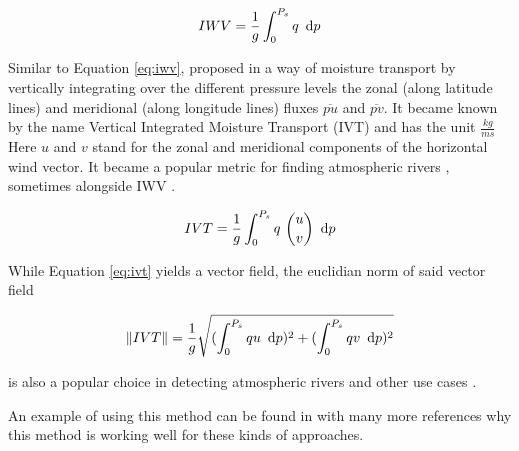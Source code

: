 \begin{equation}
\label{eq:iwv}
IWV = \frac{1}{g} \int^{P_s}_0 q ~\operatorname{d}\!{p}
\end{equation}






Similar to Equation \ref{eq:iwv},  \citeauthor{zhu_proposed_1998} proposed in \cite{zhu_proposed_1998} a way of moisture transport by vertically integrating over the different pressure levels the zonal (along latitude lines) and meridional (along longitude lines) fluxes $\overline{pu}$ and $\overline{pv}$.
It became known by the name Vertical Integrated Moisture Transport (IVT) and has the unit $\frac{kg}{ms}$
Here $u$ and $v$ stand for the zonal and meridional components of the horizontal wind vector. 
It became a popular metric for finding atmospheric rivers \cite{gimeno_atmospheric_2014}, sometimes alongside IWV \cite{eiras-barca_seasonal_2016}.

\begin{equation}
\label{eq:ivt}  
IVT = \frac{1}{g} \int^{P_s}_0 q ~\binom{u}{v} ~ \operatorname{d}\!{p}
\end{equation}

While Equation \ref{eq:ivt} yields a vector field, the euclidian norm of said vector field 

\begin{equation}
\label{eq:ivtnorm}
\lVert IVT \rVert = \frac{1}{g} \sqrt{(\int^{P_s}_0 qu ~ \operatorname{d}\!{p})^2 + (\int^{P_s}_0 qv ~ \operatorname{d}\!{p})^2}  
\end{equation}

is also a popular choice in detecting atmospheric rivers \cite{sousa_north_2020, ramos_atmospheric_2016} and other use cases \cite{ayantobo_integrated_2022}.

An example of using this method can be found in \cite{ayantobo_integrated_2022} with many more references why this method is working well for these kinds of approaches. 

